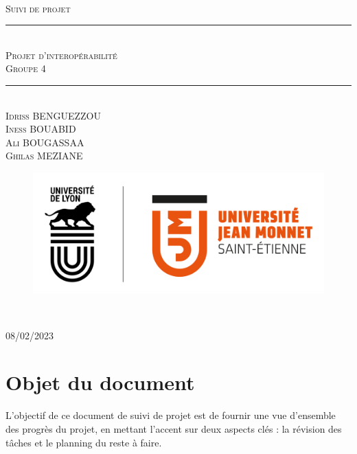 \documentclass[a4paper, 12pt]{article}
\newcommand{\HRule}{\rule{\linewidth}{0.5mm}}
\begin{document}
\begin{titlepage}
  \begin{sffamily}
  \begin{center}

   
  \textsc{\LARGE }\\[2cm]

    \textsc{\Large Suivi de projet}

    \HRule \\[0.4cm]
    { \huge  \textsc{Projet d'interopérabilité} \\
    \textsc{\small Groupe 4}\\ [0.4cm] }
	

    \HRule \\[2cm]
    \textsc {Idriss BENGUEZZOU\\ Iness BOUABID\\Ali BOUGASSAA\\Ghilas MEZIANE }
 \begin{figure}
     \centering
    \includegraphics[scale=0.2]{logoUJM.png}
     \label{fig:ujm_logo}
 \end{figure}
   
    \

    \vfill

    {\large {} 08/02/2023}

  \end{center}
  \end{sffamily}
\end{titlepage}


\newpage
\tableofcontents

\newpage
\section{Objet du document}

L'objectif de ce document de suivi de projet est de fournir une vue d'ensemble des progrès du projet, en mettant l'accent sur deux aspects clés : la révision des tâches et le planning du reste à faire.
\end{document}
